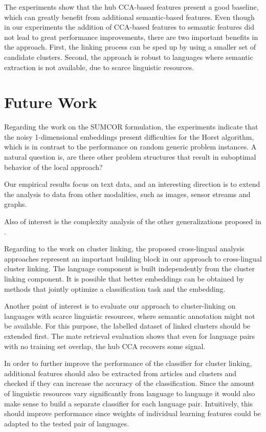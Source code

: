 The experiments show that the hub CCA-based features present a good baseline, 
which can greatly benefit from additional semantic-based features. Even though 
in our experiments the addition of CCA-based features to semantic features did not 
lead to great performance improvements, there are two important benefits in the 
approach. First, the linking process can be sped up by using a smaller set of
candidate clusters. Second, the approach is robust to languages where semantic 
extraction is not available, due to scarce linguistic resources.

\section{Future Work}

Regarding the work on the SUMCOR formulation, the experiments indicate 
that the noisy 1-dimensional embeddings present difficulties for the Horst
algorithm, which is in contrast to the performance on random generic problem instances. A natural
question is, are there other problem structures that result in suboptimal behavior of the local approach? 

Our empirical results focus on text data, and an interesting direction is to extend the analysis to 
data from other modalities, such as images, sensor streams and graphs.

Also of interest is the complexity analysis of the other generalizations proposed in \cite{Kettenring}.

Regarding to the work on cluster linking, the proposed cross-lingual analysis approaches represent an important building block in our
approach to cross-lingual cluster linking. The language component is 
built independently from the cluster linking component. 
It is possible that better embeddings can be obtained by methods that
jointly optimize a classification task and the embedding.

Another point of interest is to evaluate our approach to cluster-linking on languages with scarce 
linguistic resources, where semantic annotation might not be available. For this purpose, 
the labelled dataset of linked clusters should be extended first. The mate retrieval evaluation 
shows that even for language pairs with no training set overlap, the hub CCA recovers some signal.

In order to further improve the performance of the classifier for cluster linking, additional features should also
be extracted from articles and clusters and checked if they can increase the accuracy of the classification.
Since the amount of linguistic resources vary significantly from language to language it would also make sense
to build a separate classifier for each language pair. Intuitively, this should improve performance since weights
of individual learning features could be adapted to the tested pair of languages.
